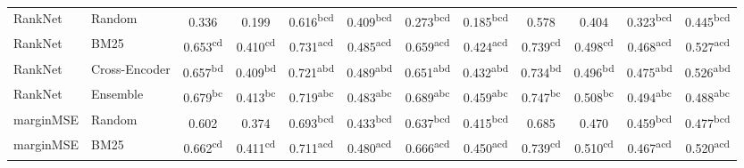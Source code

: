 \begin{table}[t]
\begin{tabular}{llcccccccccc}
  RankNet & Random & 0.336\textsuperscript{\phantom{aaa}} & 0.199\textsuperscript{\phantom{aaa}} & 0.616\textsuperscript{bcd\phantom{}} & 0.409\textsuperscript{bcd\phantom{}} & 0.273\textsuperscript{bcd\phantom{}} & 0.185\textsuperscript{bcd\phantom{}} & 0.578\textsuperscript{\phantom{aaa}} & 0.404\textsuperscript{\phantom{aaa}} & 0.323\textsuperscript{bcd\phantom{}} & 0.445\textsuperscript{bcd\phantom{}} \\
  RankNet & BM25 & 0.653\textsuperscript{cd\phantom{a}} & 0.410\textsuperscript{cd\phantom{a}} & 0.731\textsuperscript{acd\phantom{}} & 0.485\textsuperscript{acd\phantom{}} & 0.659\textsuperscript{acd\phantom{}} & 0.424\textsuperscript{acd\phantom{}} & 0.739\textsuperscript{cd\phantom{a}} & 0.498\textsuperscript{cd\phantom{a}} & 0.468\textsuperscript{acd\phantom{}} & 0.527\textsuperscript{acd\phantom{}} \\
  RankNet & Cross-Encoder & 0.657\textsuperscript{bd\phantom{a}} & 0.409\textsuperscript{bd\phantom{a}} & 0.721\textsuperscript{abd\phantom{}} & 0.489\textsuperscript{abd\phantom{}} & 0.651\textsuperscript{abd\phantom{}} & 0.432\textsuperscript{abd\phantom{}} & 0.734\textsuperscript{bd\phantom{a}} & 0.496\textsuperscript{bd\phantom{a}} & 0.475\textsuperscript{abd\phantom{}} & 0.526\textsuperscript{abd\phantom{}} \\
  RankNet & Ensemble & 0.679\textsuperscript{bc\phantom{a}} & 0.413\textsuperscript{bc\phantom{a}} & 0.719\textsuperscript{abc\phantom{}} & 0.483\textsuperscript{abc\phantom{}} & 0.689\textsuperscript{abc\phantom{}} & 0.459\textsuperscript{abc\phantom{}} & 0.747\textsuperscript{bc\phantom{a}} & 0.508\textsuperscript{bc\phantom{a}} & 0.494\textsuperscript{abc\phantom{}} & 0.488\textsuperscript{abc\phantom{}} \\
  marginMSE & Random & 0.602\textsuperscript{\phantom{aaa}} & 0.374\textsuperscript{\phantom{aaa}} & 0.693\textsuperscript{bcd\phantom{}} & 0.433\textsuperscript{bcd\phantom{}} & 0.637\textsuperscript{bcd\phantom{}} & 0.415\textsuperscript{bcd\phantom{}} & 0.685\textsuperscript{\phantom{aaa}} & 0.470\textsuperscript{\phantom{aaa}} & 0.459\textsuperscript{bcd\phantom{}} & 0.477\textsuperscript{bcd\phantom{}} \\
  marginMSE & BM25 & 0.662\textsuperscript{cd\phantom{a}} & 0.411\textsuperscript{cd\phantom{a}} & 0.711\textsuperscript{acd\phantom{}} & 0.480\textsuperscript{acd\phantom{}} & 0.666\textsuperscript{acd\phantom{}} & 0.450\textsuperscript{acd\phantom{}} & 0.739\textsuperscript{cd\phantom{a}} & 0.510\textsuperscript{cd\phantom{a}} & 0.467\textsuperscript{acd\phantom{}} & 0.520\textsuperscript{acd\phantom{}} \\

\end{tabular}
\end{table}
